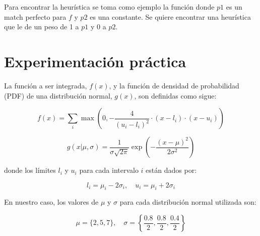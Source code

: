 \documentclass{article}
\begin{document}
Para encontrar la heurística se toma como ejemplo la función donde $p1$ es un match perfecto para $f$ y $p2$ es una constante.
Se quiere encontrar una heurística que le de un peso de 1 a $p1$ y 0 a $p2$.

\section{Experimentación práctica}

La función a ser integrada, \( f(x) \), y la función de densidad de probabilidad (PDF) de una distribución normal, \( g(x) \), son definidas como sigue:

\[
f(x) = \sum_{i} \max\left(0, -\frac{4}{(u_i - l_i)^2} \cdot (x - l_i) \cdot (x - u_i)\right)
\]

\[
g(x | \mu, \sigma) = \frac{1}{\sigma\sqrt{2\pi}} \exp\left(-\frac{(x - \mu)^2}{2\sigma^2}\right)
\]

donde los límites \( l_i \) y \( u_i \) para cada intervalo \( i \) están dados por:

\[
l_i = \mu_i - 2\sigma_i, \quad u_i = \mu_i + 2\sigma_i
\]

En nuestro caso, los valores de \( \mu \) y \( \sigma \) para cada distribución normal utilizada son:

\[
\mu = \{2, 5, 7\}, \quad \sigma = \left\{\frac{0.8}{2}, \frac{0.8}{2}, \frac{0.4}{2}\right\}
\]
\end{document}
